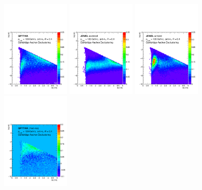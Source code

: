 \begin{figure}[h]
\centering
\includegraphics[width=0.3\textwidth]{figures/LundMC/FinalPlots/QPythia_Med.pdf}
\includegraphics[width=0.3\textwidth]{figures/LundMC/FinalPlots/Jewel_Med_RecoilOff.pdf}
\includegraphics[width=0.3\textwidth]{figures/LundMC/FinalPlots/Jewel_Med_RecoilOn.pdf}
\includegraphics[width=0.3\textwidth]{figures/LundMC/FinalPlots/QPythia_Diff.pdf}

\end{figure}
